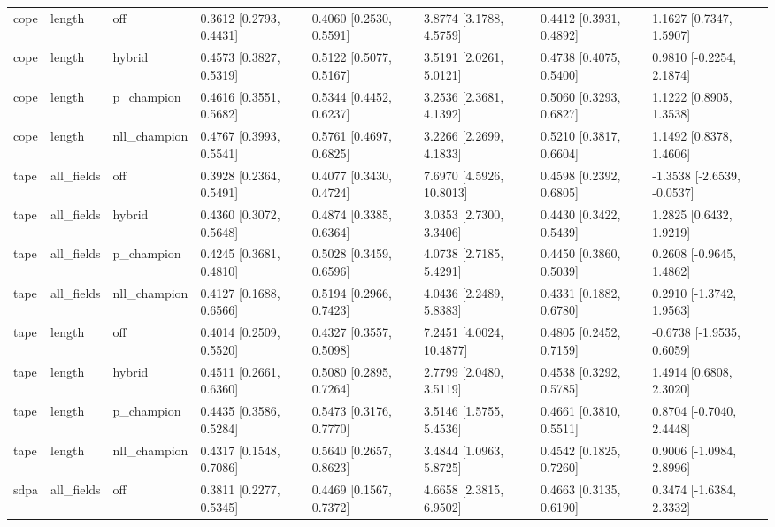 \begin{tabular}{llllllll}
cope & length & off & 0.3612 [0.2793, 0.4431] & 0.4060 [0.2530, 0.5591] & 3.8774 [3.1788, 4.5759] & 0.4412 [0.3931, 0.4892] & 1.1627 [0.7347, 1.5907] \\
cope & length & hybrid & 0.4573 [0.3827, 0.5319] & 0.5122 [0.5077, 0.5167] & 3.5191 [2.0261, 5.0121] & 0.4738 [0.4075, 0.5400] & 0.9810 [-0.2254, 2.1874] \\
cope & length & p\_champion & 0.4616 [0.3551, 0.5682] & 0.5344 [0.4452, 0.6237] & 3.2536 [2.3681, 4.1392] & 0.5060 [0.3293, 0.6827] & 1.1222 [0.8905, 1.3538] \\
cope & length & nll\_champion & 0.4767 [0.3993, 0.5541] & 0.5761 [0.4697, 0.6825] & 3.2266 [2.2699, 4.1833] & 0.5210 [0.3817, 0.6604] & 1.1492 [0.8378, 1.4606] \\
tape & all\_fields & off & 0.3928 [0.2364, 0.5491] & 0.4077 [0.3430, 0.4724] & 7.6970 [4.5926, 10.8013] & 0.4598 [0.2392, 0.6805] & -1.3538 [-2.6539, -0.0537] \\
tape & all\_fields & hybrid & 0.4360 [0.3072, 0.5648] & 0.4874 [0.3385, 0.6364] & 3.0353 [2.7300, 3.3406] & 0.4430 [0.3422, 0.5439] & 1.2825 [0.6432, 1.9219] \\
tape & all\_fields & p\_champion & 0.4245 [0.3681, 0.4810] & 0.5028 [0.3459, 0.6596] & 4.0738 [2.7185, 5.4291] & 0.4450 [0.3860, 0.5039] & 0.2608 [-0.9645, 1.4862] \\
tape & all\_fields & nll\_champion & 0.4127 [0.1688, 0.6566] & 0.5194 [0.2966, 0.7423] & 4.0436 [2.2489, 5.8383] & 0.4331 [0.1882, 0.6780] & 0.2910 [-1.3742, 1.9563] \\
tape & length & off & 0.4014 [0.2509, 0.5520] & 0.4327 [0.3557, 0.5098] & 7.2451 [4.0024, 10.4877] & 0.4805 [0.2452, 0.7159] & -0.6738 [-1.9535, 0.6059] \\
tape & length & hybrid & 0.4511 [0.2661, 0.6360] & 0.5080 [0.2895, 0.7264] & 2.7799 [2.0480, 3.5119] & 0.4538 [0.3292, 0.5785] & 1.4914 [0.6808, 2.3020] \\
tape & length & p\_champion & 0.4435 [0.3586, 0.5284] & 0.5473 [0.3176, 0.7770] & 3.5146 [1.5755, 5.4536] & 0.4661 [0.3810, 0.5511] & 0.8704 [-0.7040, 2.4448] \\
tape & length & nll\_champion & 0.4317 [0.1548, 0.7086] & 0.5640 [0.2657, 0.8623] & 3.4844 [1.0963, 5.8725] & 0.4542 [0.1825, 0.7260] & 0.9006 [-1.0984, 2.8996] \\
sdpa & all\_fields & off & 0.3811 [0.2277, 0.5345] & 0.4469 [0.1567, 0.7372] & 4.6658 [2.3815, 6.9502] & 0.4663 [0.3135, 0.6190] & 0.3474 [-1.6384, 2.3332] \\

\end{tabular}
